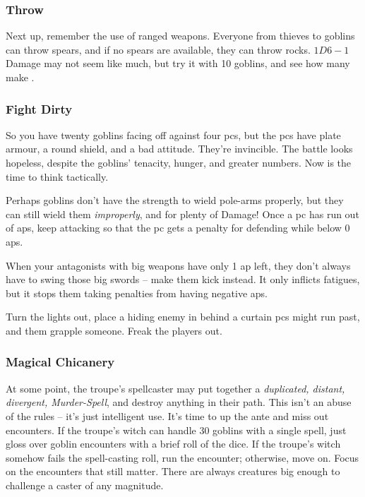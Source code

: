 \begin{multicols}{2}
\subsubsection{Throw}

Next up, remember the use of ranged weapons.
Everyone from thieves to goblins can throw spears, and if no spears are available, they can throw rocks.
$1D6-1$ Damage may not seem like much, but try it with 10 goblins, and see how many make .

\subsubsection{Fight Dirty}

So you have twenty goblins facing off against four \glspl{pc}, but the \glspl{pc} have plate armour, a round shield, and a bad attitude.
They're invincible.
The battle looks hopeless, despite the goblins' tenacity, hunger, and greater numbers.
Now is the time to think tactically.

Perhaps goblins don't have the strength to wield pole-arms properly, but they can still wield them \emph{improperly}, and for plenty of Damage!
Once a \gls{pc} has run out of \glspl{ap}, keep attacking so that the \gls{pc} gets a penalty for defending while below 0 \glspl{ap}.

When your antagonists with big weapons have only 1 \gls{ap} left, they don't always have to swing those big swords -- make them kick instead.
It only inflicts \glspl{fatigue}, but it stops them taking penalties from having negative \glspl{ap}.

Turn the lights out, place a hiding enemy in behind a curtain \glspl{pc} might run past, and them grapple someone.
Freak the players out.

\subsubsection{Magical Chicanery}

At some point, the troupe's spellcaster may put together a \textit{duplicated, distant, divergent, Murder-Spell}, and destroy anything in their path.
This isn't an abuse of the rules -- it's just intelligent use.
It's time to up the ante and miss out encounters.
If the troupe's witch can handle 30 goblins with a single spell, just gloss over goblin encounters with a brief roll of the dice.
If the troupe's witch somehow fails the spell-casting roll, run the encounter; otherwise, move on.
Focus on the encounters that still matter.
There are always creatures big enough to challenge a caster of any magnitude.


\end{multicols}

